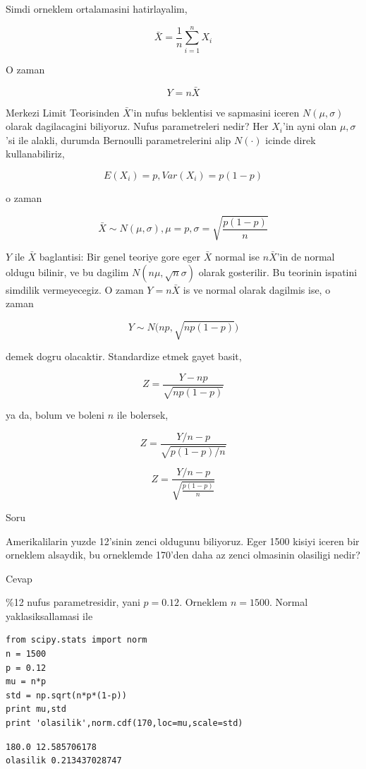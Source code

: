 \documentclass[12pt,fleqn]{article}\usepackage{../common}
\begin{document}
Simdi orneklem ortalamasini hatirlayalim,

$$ \bar{X} = \frac{1}{n}  \sum_{i=1}^n X_i $$

O zaman 

$$ Y = n\bar{X}  $$

Merkezi Limit Teorisinden $\bar{X}$'in nufus beklentisi ve sapmasini iceren
$N(\mu,\sigma)$ olarak dagilacagini biliyoruz. Nufus parametreleri nedir?
Her $X_i$'in ayni olan $\mu,\sigma$'si ile alakli, durumda Bernoulli
parametrelerini alip $N(\cdot)$ icinde direk kullanabiliriz, 

$$E(X_i) = p, Var(X_i) = p(1-p)$$

o zaman 

$$\bar{X} \sim N(\mu,\sigma), \mu = p, \sigma = \sqrt{\frac{p(1-p)}{n}}$$

$Y$ ile $\bar{X}$ baglantisi: Bir genel teoriye gore eger $\bar{X}$ normal
ise $n\bar{X}$'in de normal oldugu bilinir, ve bu dagilim
$N(n\mu,\sqrt{n}\sigma)$ olarak gosterilir. Bu teorinin ispatini simdilik
vermeyecegiz. O zaman $Y = n\bar{X}$ is ve normal olarak dagilmis ise, o zaman 

$$ Y \sim N\bigg(np, \sqrt{np(1-p)}\bigg)$$

demek dogru olacaktir. Standardize etmek gayet basit,


$$Z  = \frac{Y - np}{\sqrt{np(1-p)}}$$

ya da, bolum ve boleni $n$ ile bolersek,

$$Z  = \frac{Y/n - p}{\sqrt{p(1-p)/n}}$$


$$Z  = \frac{Y/n - p}{\sqrt{\frac{p(1-p)}{n}}}$$

Soru

Amerikalilarin yuzde 12'sinin zenci oldugunu biliyoruz. Eger 1500 kisiyi
iceren bir orneklem alsaydik, bu orneklemde 170'den daha az zenci
olmasinin olasiligi nedir? 

Cevap

\%12 nufus parametresidir, yani $p=0.12$. Orneklem $n=1500$. Normal
yaklasiksallamasi ile 

\begin{verbatim}
from scipy.stats import norm
n = 1500
p = 0.12
mu = n*p
std = np.sqrt(n*p*(1-p))
print mu,std
print 'olasilik',norm.cdf(170,loc=mu,scale=std)
\end{verbatim}

\begin{verbatim}
180.0 12.585706178
olasilik 0.213437028747
\end{verbatim}
\end{document}
